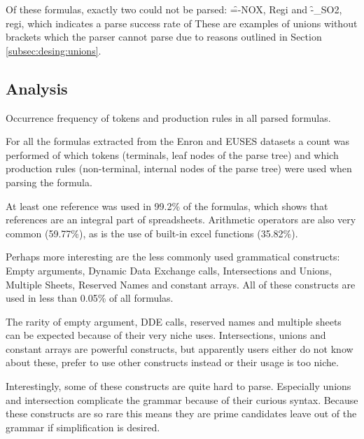 Of these formulas, exactly two could not be parsed: \f{=-NOX, Regi} and \f{-_SO2, regi}, which indicates a parse success rate of 
These are examples of unions without brackets which the parser cannot parse due to reasons outlined in Section \ref{subsec:desing:unions}.

\subsection{Analysis}

\begin{table}
	\centering
	\caption{Occurrence frequency of tokens and production rules in all parsed formulas.}
	\label{table:occurences}
\end{table}

For all the formulas extracted from the Enron and EUSES datasets a count was performed of which tokens (terminals, leaf nodes of the parse tree) and which production rules (non-terminal, internal nodes of the parse tree) were used when parsing the formula.

At least one reference was used in 99.2\% of the formulas, which shows that references are an integral part of spreadsheets.
Arithmetic operators are also very common (59.77\%), as is the use of built-in excel functions (35.82\%).

Perhaps more interesting are the less commonly used grammatical constructs: Empty arguments, Dynamic Data Exchange calls, Intersections and Unions, Multiple Sheets, Reserved Names and constant arrays.
All of these constructs are used in less than 0.05\% of all formulas.

The rarity of empty argument, DDE calls, reserved names and multiple sheets can be expected because of their very niche uses.
Intersections, unions and constant arrays are powerful constructs, but apparently users either do not know about these, prefer to use other constructs instead or their usage is too niche.

Interestingly, some of these constructs are quite hard to parse.
Especially unions and intersection complicate the grammar because of their curious syntax.
Because these constructs are so rare this means they are prime candidates leave out of the grammar if simplification is desired.